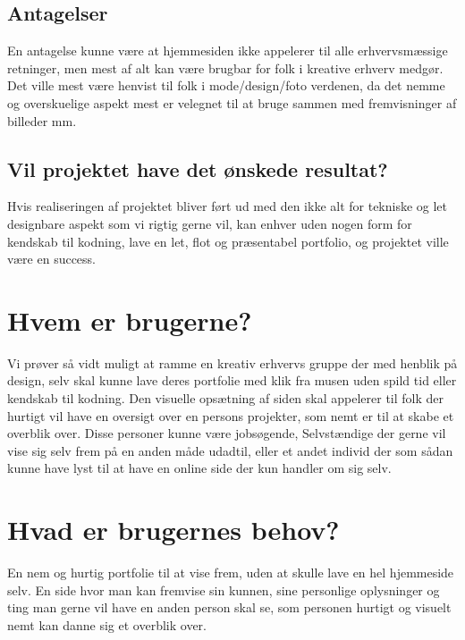 \documentclass[a4paper,titlepage,fleqn,12pt]{article}
\begin{document}
\subsection{Antagelser}
En antagelse kunne være at hjemmesiden ikke appelerer til alle erhvervsmæssige retninger, men mest af alt kan være brugbar for folk i kreative erhverv medgør. Det ville mest være henvist til folk i mode/design/foto verdenen, da det nemme og overskuelige aspekt mest er velegnet til at bruge sammen med fremvisninger af billeder mm.

\subsection{Vil projektet have det ønskede resultat?}
Hvis realiseringen af projektet bliver ført ud med den ikke alt for tekniske og let designbare aspekt som vi rigtig gerne vil, kan enhver uden nogen form for kendskab til kodning, lave en let, flot og præsentabel portfolio, og projektet ville være en success.

\section{Hvem er brugerne?}
Vi prøver så vidt muligt at ramme en kreativ erhvervs gruppe der med henblik på design, selv skal kunne lave deres portfolie med klik fra musen uden spild tid eller kendskab til kodning. Den visuelle opsætning af siden skal appelerer til folk der hurtigt vil have en oversigt over en persons projekter, som nemt er til at skabe et overblik over. Disse personer kunne være jobsøgende, Selvstændige der gerne vil vise sig selv frem på en anden måde udadtil, eller et andet individ der som sådan kunne have lyst til at have en online side der kun handler om sig selv.

\section{Hvad er brugernes behov?}
En nem og hurtig portfolie til at vise frem, uden at skulle lave en hel hjemmeside selv. En side hvor man kan fremvise sin kunnen, sine personlige oplysninger og ting man gerne vil have en anden person skal se, som personen hurtigt og visuelt nemt kan danne sig et overblik over.
\end{document}
